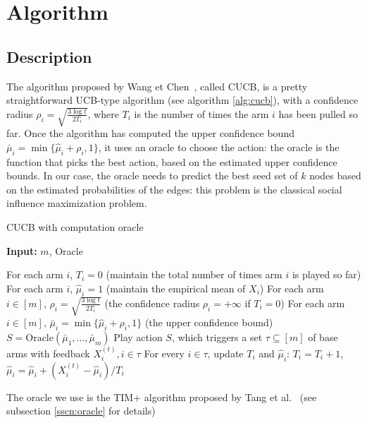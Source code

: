 \documentclass[a4paper,12pt]{article}
\begin{document}
\section{Algorithm}
\label{scn:algo}

\subsection{Description}

The algorithm proposed by Wang et Chen~\cite{wang2017improving}, called CUCB, is a pretty straightforward UCB-type algorithm (see algorithm \ref{alg:cucb}), with a confidence radius $\rho_i = \sqrt{\frac{3\log t}{2T_i}}$, where $T_i$ is the number of times the arm $i$ has been pulled so far. Once the algorithm has computed the upper confidence bound $\bar{\mu}_i = \min\{\hat{\mu}_i + \rho_i, 1\}$, it uses an oracle to choose the action: the oracle is the function that picks the best action, based on the estimated upper confidence bounds. In our case, the oracle needs to predict the best seed set of $k$ nodes based on the estimated probabilities of the edges: this problem is the classical social influence maximization problem.


\begin{algorithm}
\caption{CUCB with computation oracle}\label{alg:cucb}
\hspace*{\algorithmicindent} \textbf{Input: } $m$, Oracle
\begin{algorithmic}[1]
\State For each arm $i$, $T_i = 0$ (maintain the total number of times arm $i$ is played so far)
\State For each arm $i$, $\hat{\mu}_i = 1$ (maintain the empirical mean of $X_i$)
\State For each arm $i\in[m]$, $\rho_i = \sqrt{\frac{3\log t}{2T_i}}$ (the confidence radius $\rho_i = +\infty$ if $T_i = 0$)
\State For each arm $i\in[m]$, $\bar{\mu}_i = \min\{\hat{\mu}_i + \rho_i, 1\}$ (the upper confidence bound)
\State $S = \text{Oracle}(\bar{\mu}_1, ..., \bar{\mu}_m)$
\State Play action $S$, which triggers a set $\tau \subseteq[m]$ of base arms with feedback $X_i^{(t)}, i\in\tau$
\State For every $i\in\tau$, update $T_i$ and $\hat{\mu}_i$: $T_i = T_i+1$, $\hat{\mu}_i = \hat{\mu}_i + (X_i^{(t)} - \hat{\mu}_i) / T_i$
\EndFor
\end{algorithmic}
\end{algorithm}

The oracle we use is the TIM+ algorithm proposed by Tang et al.~\cite{tang2014influence} (see subsection \ref{sscn:oracle} for details)
\end{document}
